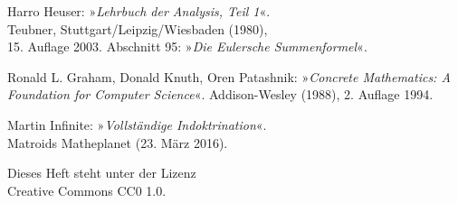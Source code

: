 \documentclass[a4paper,11pt,fleqn,twocolumn,twoside]{scrartcl}
\begin{document}
\vspace{1em}\noindent
[2] Harro Heuser: »\emph{Lehrbuch der Analysis, Teil 1}«.\\
Teubner, Stuttgart/Leipzig/Wiesbaden (1980),\\
15. Auflage 2003. Abschnitt 95: »\emph{Die Eulersche Summenformel}«.

\vspace{1em}\noindent
[3] Ronald L. Graham, Donald Knuth, Oren Patashnik:
»\emph{Concrete Mathematics: A Foundation for Computer Science}«.
Addison-Wesley (1988), 2. Auflage 1994. 

\vspace{1em}\noindent
[4] Martin Infinite: »\emph{Vollständige Indoktrination}«.\\
Matroids Matheplanet (23. März 2016).

\vfill\noindent
Dieses Heft steht unter der Lizenz\\
Creative Commons CC0 1.0.
\end{document}

